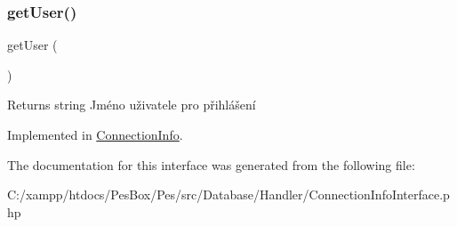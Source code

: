 \subsubsection{\texorpdfstring{get\+User()}{getUser()}}
{\footnotesize\ttfamily get\+User (\begin{DoxyParamCaption}{ }\end{DoxyParamCaption})}

\begin{DoxyReturn}{Returns}
string Jméno uživatele pro přihlášení 
\end{DoxyReturn}


Implemented in \mbox{\hyperlink{class_pes_1_1_database_1_1_handler_1_1_connection_info_ae81b7186fb97a7c6457edcc68c9aa2ef}{Connection\+Info}}.



The documentation for this interface was generated from the following file\+:\begin{DoxyCompactItemize}
\item 
C\+:/xampp/htdocs/\+Pes\+Box/\+Pes/src/\+Database/\+Handler/Connection\+Info\+Interface.\+php\end{DoxyCompactItemize}

